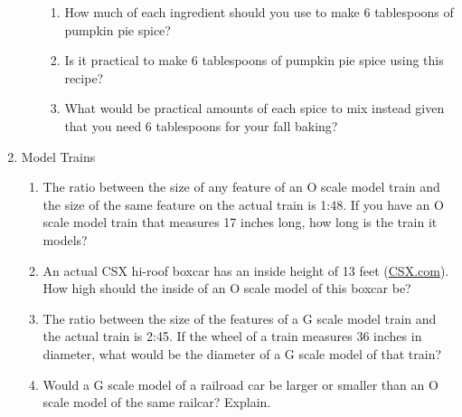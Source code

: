 \begin{enumerate}
\begin{enumerate}
\begin{enumerate}
\item How much of each ingredient should you use to make 6 tablespoons of pumpkin pie spice? 
\item Is it practical to make 6 tablespoons of pumpkin pie spice using this recipe? 
\item What would be practical amounts of each spice to mix instead given that you need 6 tablespoons for your fall baking? 
\end{enumerate}
\end{enumerate}

\item Model Trains
\begin{enumerate}
\item The ratio between the size of any feature of an O scale model train and the size of the same feature on the actual train is 1:48. If you have an O scale model train that measures 17 inches long, how long is the train it models?\wbvfill
\item An actual CSX hi-roof boxcar has an inside height of 13 feet (\href{https://www.csx.com/index.cfm/customers/resources/equipment/railroad-equipment/}{CSX.com}). How high should the inside of an O scale model of this boxcar be?\wbvfill
\item The ratio between the size of the features of a G scale model train and the actual train is 2:45. If the wheel of a train measures 36 inches in diameter, what would be the diameter of a G scale model of that train?\wbvfill
\item Would a G scale model of a railroad car be larger or smaller than an O scale model of the same railcar? Explain. \wbvfill
\end{enumerate}



\end{enumerate}
